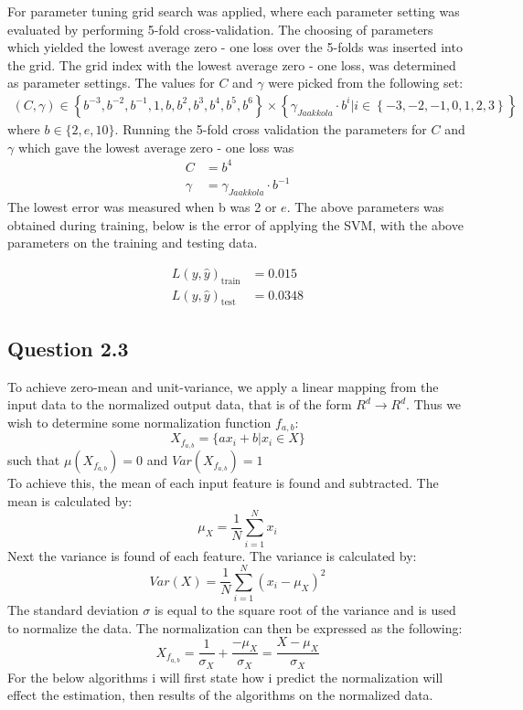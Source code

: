 \documentclass{article}
\begin{document}
For parameter tuning grid search was applied, where each parameter setting was evaluated by performing 5-fold cross-validation. The choosing of parameters which yielded the lowest average zero - one loss over the 5-folds was inserted into the grid. The grid index with the lowest average zero - one loss, was determined as parameter settings. The values for $C$ and $\gamma$ were picked from the following set:
\begin{align*}
(C,\gamma) \in \left\{ b^{-3}, b^{-2}, b^{-1}, 1, b, b^{2}, b^{3},b^4,b^5,b^6 \right\} \times \left\{ \gamma_{Jaakkola} \cdot b^{i} | i \in \left\{ -3, -2, -1, 0, 1, 2, 3 \right\} \right\}
\end{align*}
where $b \in \lbrace 2, e, 10 \rbrace$.
Running the 5-fold cross validation the parameters for $C$ and $\gamma$ which gave the lowest average zero - one loss was
\begin{align*}
C &= b^4 \\
\gamma &= \gamma_{Jaakkola} \cdot b^{-1}
\end{align*}
The lowest error was measured when b was 2 or $e$. The above parameters was obtained during training, below is the error of applying the SVM, with the above parameters on the training and testing data.

\begin{align*}
L(y,\hat{y})_{\text{train}} &= 0.015 \\
L(y,\hat{y})_{\text{test}} &= 0.0348
\end{align*}
\subsection{Question 2.3}
To achieve zero-mean and unit-variance, we apply a linear mapping from the input data to the normalized output data, that is of the form $R^d \rightarrow R^d$. Thus we wish to determine some normalization function $ f_{a,b}$:
\begin{equation}
X_{f_{a,b}}  = \lbrace a x_i+b | x_i \in X \rbrace
\end{equation}
such that $\mu(X_{f_{a,b}})=0$ and $Var(X_{f_{a,b}})=1$ \\
To achieve this, the mean of each input feature is found and subtracted. The mean is calculated by:
\begin{equation*}
\mu_X = \dfrac{1}{N} \sum\limits^{N}_{i=1}x_i
\end{equation*}
 Next the variance is found of each feature. The variance is calculated by:
\begin{equation*}
Var(X) = \dfrac{1}{N} \sum\limits^{N}_{i=1}(x_i - \mu_X)^2
\end{equation*}
The standard deviation $\sigma$ is equal to the square root of the variance and is used to normalize the data. The normalization can then be expressed as the following:
\begin{equation}
X_{f_{a,b}} = \dfrac{1}{\sigma_X} + \dfrac{- \mu_X}{\sigma_X} = \dfrac{X - \mu_X }{\sigma_X}
\label{norm}
\end{equation}
For the below algorithms i will first state how i predict the normalization will effect the estimation, then results of the algorithms on the normalized data.
\end{document}
